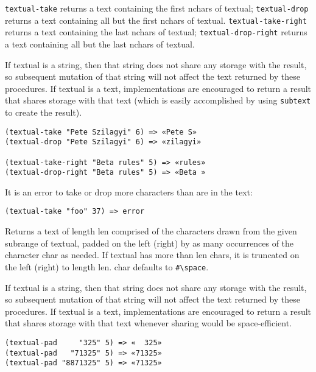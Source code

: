 \begin{entry}{%
  }
  
  \texttt{textual-take} returns a text containing the first nchars of
  textual; \texttt{textual-drop} returns a text containing all but the
  first nchars of textual. \texttt{textual-take-right} returns a text
  containing the last nchars of textual; \texttt{textual-drop-right}
  returns a text containing all but the last nchars of textual.

  If textual is a string, then that string does not share any storage
  with the result, so subsequent mutation of that string will not
  affect the text returned by these procedures. If textual is a text,
  implementations are encouraged to return a result that shares
  storage with that text (which is easily accomplished by using
  \texttt{subtext} to create the result).

\begin{verbatim}
(textual-take "Pete Szilagyi" 6) => «Pete S»
(textual-drop "Pete Szilagyi" 6) => «zilagyi»

(textual-take-right "Beta rules" 5) => «rules»
(textual-drop-right "Beta rules" 5) => «Beta »
\end{verbatim}

  It is an error to take or drop more characters than are in the text:

\begin{verbatim}
(textual-take "foo" 37) => error
\end{verbatim}
\end{entry}

\begin{entry}{%
  } 

  Returns a text of length len comprised of
  the characters drawn from the given subrange of textual, padded on
  the left (right) by as many occurrences of the character char as
  needed. If textual has more than len chars, it is truncated on the
  left (right) to length len. char defaults to
  \texttt{\#\textbackslash{}space}.

  If textual is a string, then that string does not share any storage
  with the result, so subsequent mutation of that string will not
  affect the text returned by these procedures. If textual is a text,
  implementations are encouraged to return a result that shares
  storage with that text whenever sharing would be space-efficient.

\begin{verbatim}
(textual-pad     "325" 5) => «  325»
(textual-pad   "71325" 5) => «71325»
(textual-pad "8871325" 5) => «71325»
\end{verbatim}
\end{entry}

